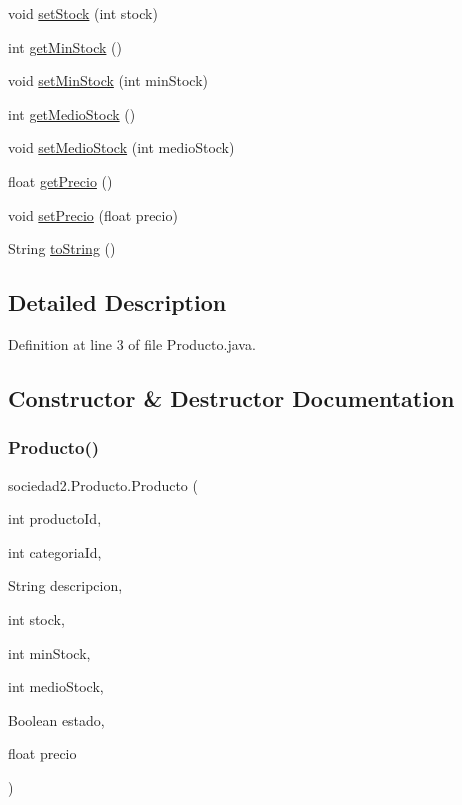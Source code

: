 \begin{DoxyCompactItemize}
\item 
void \mbox{\hyperlink{classsociedad2_1_1_producto_ae8833d16f4253ed066e0d9fb78cfb954}{set\+Stock}} (int stock)
\item 
int \mbox{\hyperlink{classsociedad2_1_1_producto_a16f2c1f7840ee35473804385138ddeb8}{get\+Min\+Stock}} ()
\item 
void \mbox{\hyperlink{classsociedad2_1_1_producto_a65c75efc7095fce58822d557b3c5905e}{set\+Min\+Stock}} (int min\+Stock)
\item 
int \mbox{\hyperlink{classsociedad2_1_1_producto_ac31e436e0f5d5da61bf04ba4991cb6d3}{get\+Medio\+Stock}} ()
\item 
void \mbox{\hyperlink{classsociedad2_1_1_producto_ab9a1a3cd64dbd56b3a7fac66a78b8bd8}{set\+Medio\+Stock}} (int medio\+Stock)
\item 
float \mbox{\hyperlink{classsociedad2_1_1_producto_adac1bb4366dc52eef74b5fba4e7018a7}{get\+Precio}} ()
\item 
void \mbox{\hyperlink{classsociedad2_1_1_producto_afd60e3881905bdd4c196d21c5545eadc}{set\+Precio}} (float precio)
\item 
String \mbox{\hyperlink{classsociedad2_1_1_producto_ae19a8691f8a521ff9eb183083f9ff6f4}{to\+String}} ()
\end{DoxyCompactItemize}


\subsection{Detailed Description}


Definition at line 3 of file Producto.\+java.



\subsection{Constructor \& Destructor Documentation}
\mbox{\label{classsociedad2_1_1_producto_a5266f0ab65459040df5d351c60f46493}} 
\subsubsection{\texorpdfstring{Producto()}{Producto()}}
{\footnotesize\ttfamily sociedad2.\+Producto.\+Producto (\begin{DoxyParamCaption}\item[{int}]{producto\+Id,  }\item[{int}]{categoria\+Id,  }\item[{String}]{descripcion,  }\item[{int}]{stock,  }\item[{int}]{min\+Stock,  }\item[{int}]{medio\+Stock,  }\item[{Boolean}]{estado,  }\item[{float}]{precio }\end{DoxyParamCaption})}



